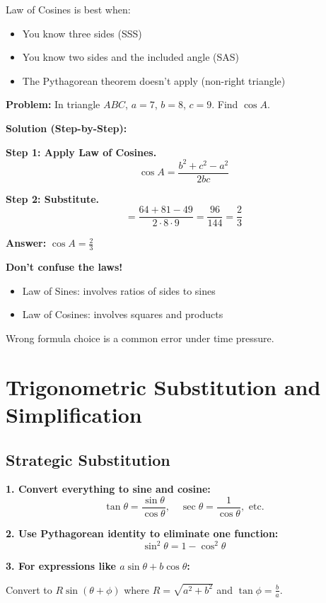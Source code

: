 \documentclass[12pt]{extarticle}
\begin{document}
\begin{conceptbox}
Law of Cosines is best when:
\begin{itemize}
\item You know three sides (SSS)
\item You know two sides and the included angle (SAS)
\item The Pythagorean theorem doesn't apply (non-right triangle)
\end{itemize}
\end{conceptbox}

\begin{examplebox}
\textbf{Problem:} In triangle $ABC$, $a = 7$, $b = 8$, $c = 9$. Find $\cos A$.

\textbf{Solution (Step-by-Step):}

\textbf{Step 1: Apply Law of Cosines.}
\[
\cos A = \frac{b^2 + c^2 - a^2}{2bc}
\]

\textbf{Step 2: Substitute.}
\[
= \frac{64 + 81 - 49}{2 \cdot 8 \cdot 9} = \frac{96}{144} = \frac{2}{3}
\]

\textbf{Answer:} $\boxed{\cos A = \frac{2}{3}}$
\end{examplebox}

\begin{warningbox}
\textbf{Don't confuse the laws!}
\begin{itemize}
\item Law of Sines: involves ratios of sides to sines
\item Law of Cosines: involves squares and products
\end{itemize}

Wrong formula choice is a common error under time pressure.
\end{warningbox}

\section{Trigonometric Substitution and Simplification}

\subsection{Strategic Substitution}

\begin{conceptbox}
\textbf{1. Convert everything to sine and cosine:}
\[
\tan\theta = \frac{\sin\theta}{\cos\theta}, \quad \sec\theta = \frac{1}{\cos\theta}, \text{ etc.}
\]

\textbf{2. Use Pythagorean identity to eliminate one function:}
\[
\sin^2\theta = 1 - \cos^2\theta
\]

\textbf{3. For expressions like $a\sin\theta + b\cos\theta$:}

Convert to $R\sin(\theta + \phi)$ where $R = \sqrt{a^2 + b^2}$ and $\tan\phi = \frac{b}{a}$.
\end{conceptbox}
\end{document}
